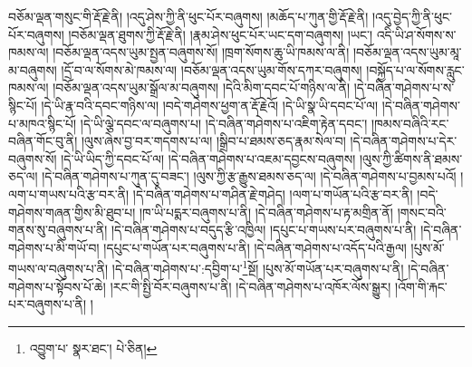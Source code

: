 བཅོམ་ལྡན་གསུང་གི་རྡོ་རྗེ་ནི། །འདུ་ཤེས་ཀྱི་ནི་ཕུང་པོར་བཞུགས། །མཆོད་པ་ཀུན་གྱི་རྡོ་རྗེ་ནི། །འདུ་བྱེད་ཀྱི་ནི་ཕུང་པོར་བཞུགས། །བཅོམ་ལྡན་ཐུགས་ཀྱི་རྡོ་རྗེ་ནི། །རྣམ་ཤེས་ཕུང་པོར་ཡང་དག་བཞུགས། །ཡང་། འདི་ཡི་ཤ་སོགས་ས་ཁམས་ལ། །བཅོམ་ལྡན་འདས་ཡུམ་སྤྱན་བཞུགས་སོ། །ཁྲག་སོགས་ཆུ་ཡི་ཁམས་ལ་ནི། །བཅོམ་ལྡན་འདས་ཡུམ་མཱ་མ་བཞུགས། །དྲོ་བ་ལ་སོགས་མེ་ཁམས་ལ། །བཅོམ་ལྡན་འདས་ཡུམ་གོས་དཀར་བཞུགས། །བསྐྱོད་པ་ལ་སོགས་རླུང་ཁམས་ལ། །བཅོམ་ལྡན་འདས་ཡུམ་སྒྲོལ་མ་བཞུགས། །དེའི་མིག་དབང་པོ་གཉིས་ལ་ནི། །དེ་བཞིན་གཤེགས་པ་ས་སྙིང་པོ། །དེ་ཡི་རྣ་བའི་དབང་གཉིས་ལ། །བདེ་གཤེགས་ཕྱག་ན་རྡོ་རྗེའོ། །དེ་ཡི་སྣ་ཡི་དབང་པོ་ལ། །དེ་བཞིན་གཤེགས་པ་མཁའ་སྙིང་པོ། །དེ་ཡི་ལྕེ་དབང་ལ་བཞུགས་པ། །དེ་བཞིན་གཤེགས་པ་འཇིག་རྟེན་དབང་། །ཁམས་བཞིའི་རང་བཞིན་གོང་བུ་ནི། །ལུས་ཞེས་བྱ་བར་གདགས་པ་ལ། །སྒྲིབ་པ་ཐམས་ཅད་རྣམ་སེལ་བ། །དེ་བཞིན་གཤེགས་པ་དེར་བཞུགས་སོ། །དེ་ཡི་ཡིད་ཀྱི་དབང་པོ་ལ། །དེ་བཞིན་གཤེགས་པ་འཇམ་དབྱངས་བཞུགས། །ལུས་ཀྱི་ཚིགས་ནི་ཐམས་ཅད་ལ། །དེ་བཞིན་གཤེགས་པ་ཀུན་དུ་བཟང་། །ལུས་ཀྱི་རྩ་རྒྱུས་ཐམས་ཅད་ལ། །དེ་བཞིན་གཤེགས་པ་བྱམས་པའོ། །ལག་པ་གཡས་པའི་རྩ་བར་ནི། །དེ་བཞིན་གཤེགས་པ་གཤིན་རྗེ་གཤེད། །ལག་པ་གཡོན་པའི་རྩ་བར་ནི། །བདེ་གཤེགས་གཞན་གྱིས་མི་ཐུབ་པ། །ཁ་ཡི་པདྨར་བཞུགས་པ་ནི། །དེ་བཞིན་གཤེགས་པ་རྟ་མགྲིན་ནོ། །གསང་བའི་གནས་སུ་བཞུགས་པ་ནི། །དེ་བཞིན་གཤེགས་པ་བདུད་རྩི་འཁྱིལ། །དཔུང་པ་གཡས་པར་བཞུགས་པ་ནི། །དེ་བཞིན་གཤེགས་པ་མི་གཡོ་བ། །དཔུང་པ་གཡོན་པར་བཞུགས་པ་ནི། །དེ་བཞིན་གཤེགས་པ་འདོད་པའི་རྒྱལ། །པུས་མོ་གཡས་ལ་བཞུགས་པ་ནི། །དེ་བཞིན་གཤེགས་པ་:དབྱིག་པ་\footnote{འབྱུག་པ་  སྣར་ཐང་།  པེ་ཅིན། }སྔོ། །པུས་མོ་གཡོན་པར་བཞུགས་པ་ནི། །དེ་བཞིན་གཤེགས་པ་སྟོབས་པོ་ཆེ། །རང་གི་སྤྱི་བོར་བཞུགས་པ་ནི། །དེ་བཞིན་གཤེགས་པ་འཁོར་ལོས་སྒྱུར། །འོག་གི་རྐང་པར་བཞུགས་པ་ནི། །
